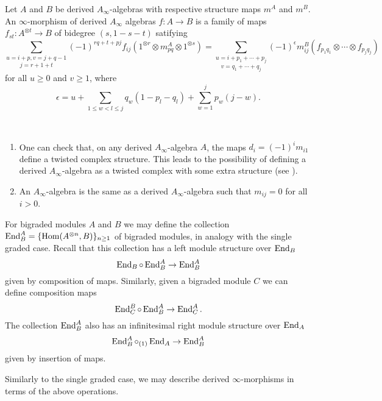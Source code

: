 \documentclass[join.tex]{subfiles}
\begin{document}
\begin{defin}
Let $A$ and $B$ be derived $A_\infty$-algebras with respective structure maps $m^A$ and $m^B$. An $\infty$-morphism of derived $A_\infty$ algebras $f:A\to B$ is a family of maps $f_{st}:A^{\otimes t}\to B$ of bidegree $(s,1-s-t)$ satifying
\begin{equation}\label{dinftymaps}
\underset{j=r+1+t}{\sum_{u=i+p, v=j+q-1}}(-1)^{rq+t+pj}f_{ij}(1^{\otimes r}\otimes m_{pq}^A\otimes 1^{\otimes s})=\underset{v=q_1+\cdots +q_j}{\sum_{u=i+p_1+\cdots +p_j}}(-1)^{\epsilon} m^B_{ij}(f_{p_1 q_1}\otimes\cdots\otimes f_{p_j q_j})
\end{equation}
for all $u\geq 0$ and $v\geq 1$, where
\[\epsilon = u + \sum_{1\leq w < l \leq j} q_w(1-p_l-q_l)  + \sum_{w=1}^j p_w(j-w).\]
\end{defin}
\begin{ex}\
\begin{enumerate}
\item One can check that, on any derived $A_\infty$-algebra $A$, the maps $d_i=(-1)^{i}m_{i1}$ define a twisted complex structure. This leads to the possibility of defining a derived $A_\infty$-algebra as a twisted complex with some extra structure (see ).
\item An $A_\infty$-algebra is the same as a derived $A_\infty$-algebra such that $m_{ij}=0$ for all $i>0$.
\end{enumerate}
\end{ex}

For bigraded modules $A$ and $B$ we may define the collection $\operatorname{End}^A_B=\{\operatorname{Hom}(A^{\otimes n}, B)\}_{n\geq 1}$ of bigraded modules,  in analogy with the single graded case. Recall that this collection has a left module structure over $\operatorname{End}_B$
\[\operatorname{End}_B\circ \operatorname{End}^A_B\to \operatorname{End}^A_B\]
given by composition of maps. Similarly, given a bigraded module $C$ we can define composition maps
\[\operatorname{End}^B_C\circ \operatorname{End}^A_B\to \operatorname{End}^A_C.\]
The collection $\operatorname{End}^A_B$ also has an infinitesimal right module structure over $\operatorname{End}_A$
\[\operatorname{End}^A_B\circ_{(1)}\operatorname{End}_A\to \operatorname{End}^A_B\]
given by insertion of maps.

Similarly to the single graded case, we may describe derived $\infty$-morphisms in terms of the above operations.
\end{document}
